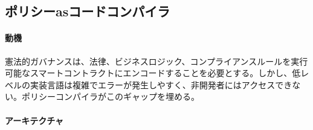 \documentclass[11pt]{article}
\begin{document}
\subsection{ポリシーasコードコンパイラ}
\label{sec:policy-compiler}
\paragraph{動機} 憲法的ガバナンスは、法律、ビジネスロジック、コンプライアンスルールを実行可能なスマートコントラクトにエンコードすることを必要とする。しかし、低レベルの実装言語は複雑でエラーが発生しやすく、非開発者にはアクセスできない。ポリシーコンパイラがこのギャップを埋める。

\paragraph{アーキテクチャ}
\end{document}
